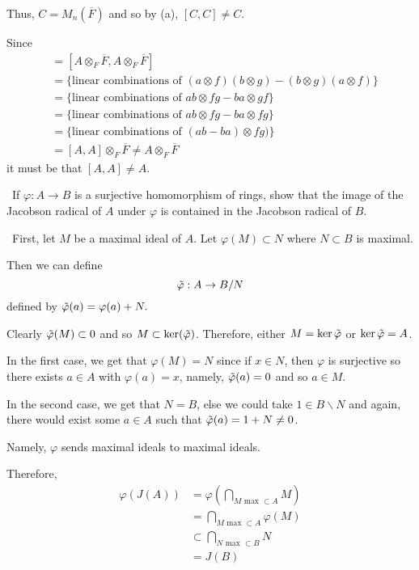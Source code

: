 \documentclass[12pt]{Qual}
\begin{document}
\begin{solution}
\begin{enumerate}[label=(\alph*)]
    Thus, $C=M_n(\overline{F})$ and so by (a), $[C,C]\not=C$.

    Since \begin{align*}
        [C,C]&=[A\otimes_F\overline{F},A\otimes_F\overline{F}]\\
        &=\{\text{linear combinations of }(a\otimes f)(b\otimes g)-(b\otimes g)(a\otimes f)\}\\
        &=\{\text{linear combinations of }ab\otimes fg-ba\otimes gf\}\\
        &=\{\text{linear combinations of }ab\otimes fg-ba\otimes fg\}\\
        &=\{\text{linear combinations of }(ab-ba)\otimes fg)\}\\
        &=[A,A]\otimes_F\overline{F}\not=A\otimes_F\overline{F}
    \end{align*} it must be that $[A,A]\not=A$.
\end{enumerate}
\end{solution}
\newpage



\begin{problem} $\,$
If $\varphi:A\to B$ is a surjective homomorphism of rings, show that the image of the Jacobson radical of $A$ under $\varphi$ is contained in the Jacobson radical of $B$.
\end{problem}


\begin{solution}$\,$
First, let $M$ be a maximal ideal of $A$. Let $\varphi(M)\subset N$ where $N\subset B$ is maximal.

Then we can define $$\Tilde{\varphi}:A\to B/N$$ defined by $\Tilde{\varphi}(a)=\varphi(a)+N.$

Clearly $\Tilde{\varphi}(M)\subset 0$ and so $M\subset\ker(\Tilde{\varphi})$. Therefore, either $M=\ker\Tilde{\varphi}$ or $\ker\Tilde{\varphi}=A$.

In the first case, we get that $\varphi(M)=N$ since if $x\in N$, then $\varphi$ is surjective so there exists $a\in A$ with $\varphi(a)=x$, namely, $\Tilde{\varphi}(a)=0$ and so $a\in M$.

In the second case, we get that $N=B$, else we could take $1\in B\backslash N$ and again, there would exist some $a\in A$ such that $\Tilde{\varphi}(a)=1+N\not=0$.

Namely, $\varphi$ sends maximal ideals to maximal ideals.

Therefore, \begin{align*}
    \varphi(J(A))&=\varphi\left(\bigcap_{M\text{ max }\subset A}M\right)\\
    &=\bigcap_{M\text{ max }\subset A}\varphi(M)\\
    &\subset \bigcap_{N\text{ max }\subset B}N\\
    &=J(B)
\end{align*}
\end{solution}
\newpage
\end{document}
